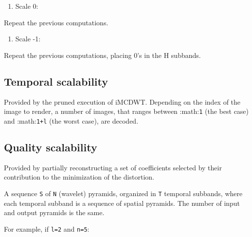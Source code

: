 \begin{enumerate}
\def\labelenumi{\arabic{enumi}.}
\setcounter{enumi}{2}
\tightlist
\item
  Scale 0:
\end{enumerate}

Repeat the previous computations.

\begin{enumerate}
\def\labelenumi{\arabic{enumi}.}
\setcounter{enumi}{3}
\tightlist
\item
  Scale -1:
\end{enumerate}

Repeat the previous computations, placing 0's in the H subbands.

\hypertarget{temporal-scalability}{%
\subsection{Temporal scalability}\label{temporal-scalability}}

Provided by the pruned execution of iMCDWT. Depending on the index of
the image to render, a number of images, that ranges between
:math:\texttt{1} (the best case) and :math:\texttt{1+l} (the worst
case), are decoded.

\hypertarget{quality-scalability}{%
\subsection{Quality scalability}\label{quality-scalability}}

Provided by partially reconstructing a set of coefficients selected by
their contribution to the minimization of the distortion.

    A sequence \texttt{S} of \texttt{N} (wavelet) pyramids, organized in
\texttt{T} temporal subbands, where each temporal subband is a sequence
of spatial pyramids. The number of input and output pyramids is the
same.

For example, if \texttt{l=2} and \texttt{n=5}:

